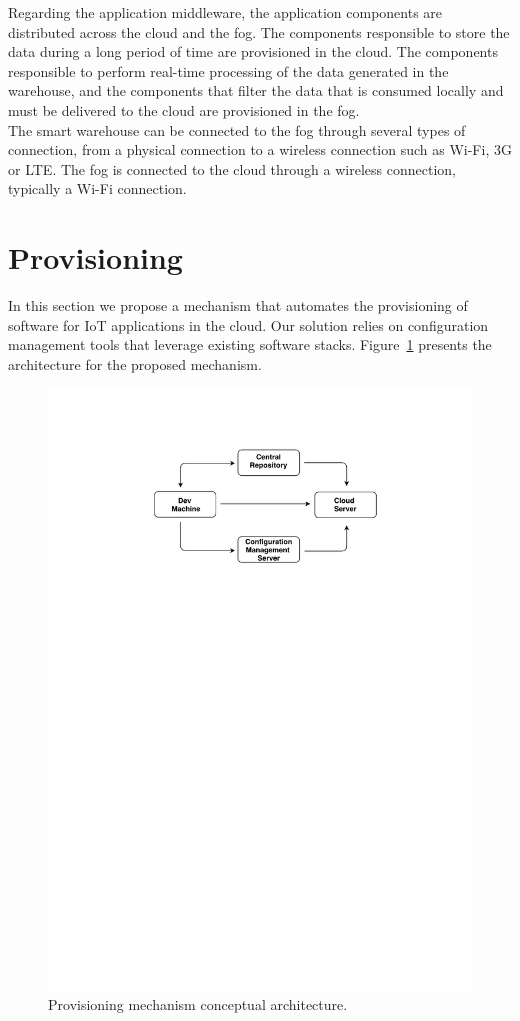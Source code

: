 Regarding the application middleware, the application components are distributed across the cloud and
the fog. The components responsible to store the data during a long period of time are provisioned in
the cloud. The components responsible to perform real-time processing of the data generated in the
warehouse, and the components that filter the data that is consumed locally and must be delivered to
the cloud are provisioned in the fog.\\

The smart warehouse can be connected to the fog through several types of connection, from a physical
connection to a wireless connection such as Wi-Fi, 3G or \gls{LTE}. The fog is connected to the cloud
through a wireless connection, typically a Wi-Fi connection.

\section{Provisioning}
\label{sec:provisioning}
In this section we propose a mechanism that automates the provisioning of software for \gls{IoT} applications
in the cloud. Our solution relies on configuration management tools that leverage existing software
stacks. Figure~\ref{fig:provisioning_generic_architecture} presents the architecture for the proposed
mechanism.\\

\begin{figure}[ht!]
  \centering
  \includegraphics[width=.7\textwidth]{images/c4t-generic-solution.pdf}
  \caption{Provisioning mechanism conceptual architecture.}
  \label{fig:provisioning_generic_architecture}
\end{figure}

